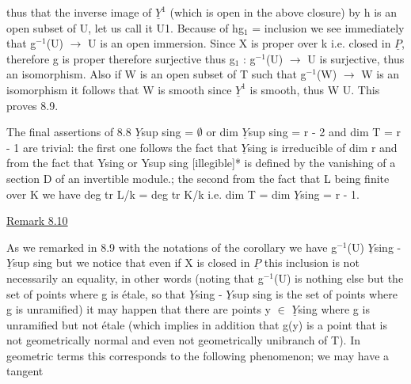
thus that the inverse image of $\underline{Y}^{1}$ (which is open in the above
closure) by h is an open subset of U, let us call it U1.  Because
of hg$_{1}$ = inclusion we see immediately that g$^{-1}$(U) $\to$ U is an open
immersion.  Since X is proper over k i.e. closed in $\underline{P}$, therefore g
is proper therefore surjective thus g$_{1}$ : g$^{-1}$(U) $\to$ U is
surjective, thus an isomorphism.  Also if W is an open subset of T
such that g$^{-1}$(W) $\to$ W is an isomorphism it follows that W is smooth
since $\underline{Y}^{1}$ is smooth, thus W \hand{$\subset$} U.  This proves 8.9.

The final assertions of 8.8 $\underline{Y}$sup sing = $\emptyset$ or dim $\underline{Y}$sup sing =
r - 2 and dim T = r - 1 are trivial:  the first one follows the
fact that $\underline{Y}$sing is irreducible of dim r and from the fact that Ysing
or Ysup sing [illegible]* is defined by the vanishing of a section D
of an invertible module.; the second from the fact that L being
finite over K we have deg tr L/k = deg tr K/k i.e. dim T = dim
$\underline{Y}$sing = r - 1.

\uline{Remark 8.10}

As we remarked in 8.9 with the notations of the corollary we
have g$^{-1}$(U) \hand{$\subset$} $\underline{Y}$sing - $\underline{Y}$sup sing but we notice that even if X is
closed in $\underline{P}$ this inclusion is not necessarily an equality, in
other words (noting that g$^{-1}$(U) is nothing else but the set of
points where g is étale, so that $\underline{Y}$sing - $\underline{Y}$sup sing is the set of
points where g is unramified) it may happen that there are points
y $\in$ $\underline{Y}$sing where g is unramified but not étale (which implies in
addition that g(y) is a point that is not geometrically normal and
even not geometrically unibranch of T).  In geometric terms this
corresponds to the following phenomenon; we may have a tangent

